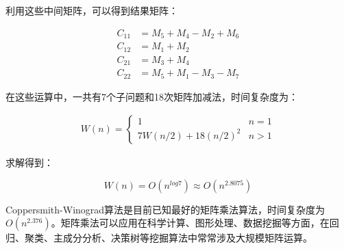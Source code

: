 利用这些中间矩阵，可以得到结果矩阵：

\vspace{-1cm}

\begin{align*}
    C_{11} & = M_5 + M_4 - M_2 + M_6 \\
    C_{12} & = M_1 + M_2             \\
    C_{21} & = M_3 + M_4             \\
    C_{22} & = M_5 + M_1 - M_3 - M_7
\end{align*}

在这些运算中，一共有7个子问题和18次矩阵加减法，时间复杂度为：

\vspace{-1cm}

\begin{align*}
    W(n) = \begin{cases}
        1                   & n = 1 \\
        7W(n/2) + 18(n/2)^2 & n > 1
    \end{cases}
\end{align*}

求解得到：

\vspace{-0.5cm}

$$
    W(n) = O(n^{log7}) \approx O(n^{2.8075})
$$

Coppersmith-Winograd算法是目前已知最好的矩阵乘法算法，时间复杂度为$ O(n^{2.376}) $。矩阵乘法可以应用在科学计算、图形处理、数据挖掘等方面，在回归、聚类、主成分分析、决策树等挖掘算法中常常涉及大规模矩阵运算。

\newpage